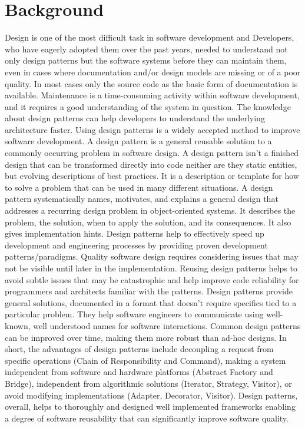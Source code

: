 \documentclass[12pt]{book}
\begin{document}
\section{Background}
Design is one of the most difficult task in software development  and Developers, who have eagerly adopted them over the past years, needed to understand not only design patterns but the software systems before they can maintain them, even in cases where documentation and/or design models are missing or of a poor quality. In most cases only the source code as the basic form of documentation is available. Maintenance is a time-consuming activity within software development, and it requires a good understanding of the system in question. The knowledge about design patterns can help developers to understand the underlying architecture faster. Using design patterns is a widely accepted method to improve software development.
A design pattern is a general reusable solution to a commonly occurring  problem in software design. A design pattern isn't a finished design that can be transformed directly into code neither are they static entities, but evolving descriptions of best practices. It is a description or template for how to solve a problem that can be used in many different situations. A design pattern systematically names, motivates, and explains a general design that addresses a recurring design problem in object-oriented systems. It describes the problem, the solution, when to apply the solution, and its consequences. It also gives implementation hints.
Design patterns help to effectively speed up development and engineering processes by providing proven development patterns/paradigms. Quality software design requires considering issues that may not be visible until later in the implementation. Reusing design patterns helps to avoid subtle issues that may be catastrophic and help improve code reliability for programmers and architects familiar with the patterns. 
Design patterns provide general solutions, documented in a format that doesn't require specifics tied to a particular problem. They help software engineers to communicate using well-known, well understood names for software interactions. Common design patterns can be improved over time, making them more robust than ad-hoc designs. In short, the advantages of design patterns include decoupling a request from specific operations (Chain of Responsibility and Command), making a system independent from software and hardware platforms (Abstract Factory and Bridge), independent from algorithmic solutions (Iterator, Strategy, Visitor), or avoid modifying implementations (Adapter, Decorator, Visitor). Design patterns, overall, helps to thoroughly and designed well implemented frameworks enabling a degree of software reusability that can significantly improve software quality.
\end{document}

